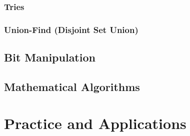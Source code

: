 \section{Tries}





\section{Union-Find (Disjoint Set Union)}






\chapter{Bit Manipulation}









\chapter{Mathematical Algorithms}






\part{Practice and Applications}







% 





